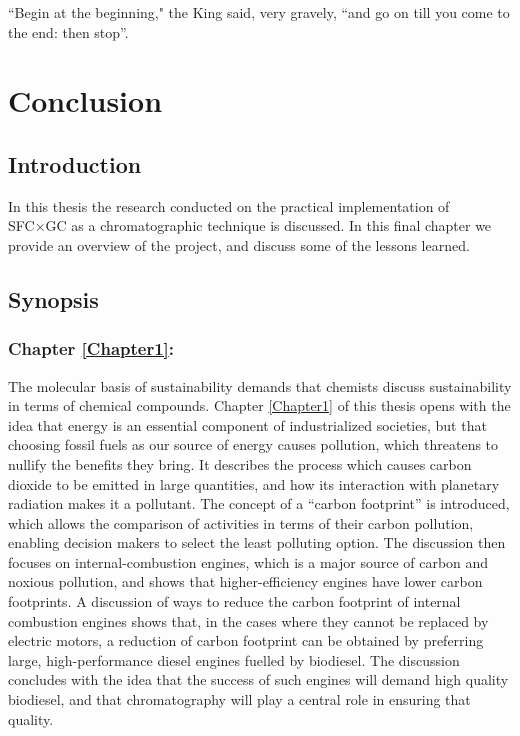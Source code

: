 
\begin{savequote}[\quotewidth]
``Begin at the beginning," the King said, very gravely, ``and go on till you come to the end: then stop''.
\end{savequote}

\chapter{Conclusion} %


\section{Introduction}


In this thesis the research conducted on the practical implementation of SFC×GC
as a chromatographic technique is discussed. In this final chapter we provide an
overview of the project, and discuss some of the lessons learned.

\section{Synopsis}

\subsection{Chapter \ref{Chapter1}:  }

The molecular basis of sustainability \autocite{Anastas2016} demands that
chemists discuss sustainability in terms of chemical compounds. Chapter
\ref{Chapter1} of this thesis opens with the idea that energy is an essential
component of industrialized societies, but that choosing fossil fuels as our
source of energy causes pollution, which threatens to nullify the benefits they
bring. It describes the process which causes carbon dioxide to be emitted in
large quantities, and how its interaction with planetary radiation makes it a
pollutant. The concept of a ``carbon footprint'' is introduced, which allows the
comparison of activities in terms of their carbon pollution, enabling decision
makers to select the least polluting option. The discussion then focuses on
internal-combustion engines, which is a major source of carbon and noxious
pollution, and shows that higher-efficiency engines have lower carbon
footprints. A discussion of ways to reduce the carbon footprint of internal
combustion engines shows that, in the cases where they cannot be replaced by
electric motors, a reduction of carbon footprint can be obtained by preferring
large, high-performance diesel engines fuelled by biodiesel. The discussion
concludes with the idea that the success of such engines will demand high
quality biodiesel, and that chromatography will play a central role in ensuring
that quality.

